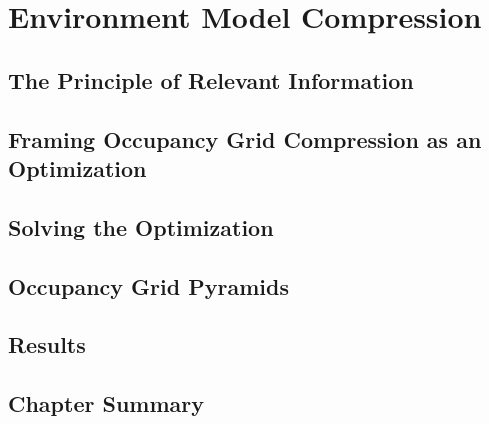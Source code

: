 \chapter{Environment Model Compression}

\section{The Principle of Relevant Information}

\section{Framing Occupancy Grid Compression as an Optimization}

\section{Solving the Optimization}

\section{Occupancy Grid Pyramids}

\section{Results}

\section{Chapter Summary}
